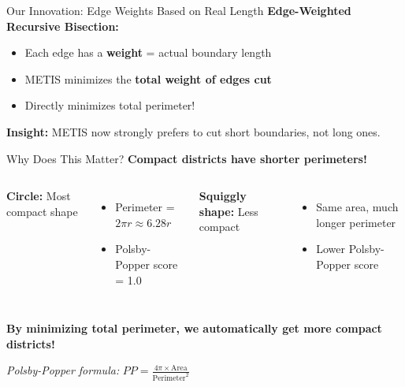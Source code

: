 \documentclass[aspectratio=169]{beamer}
\begin{document}
\begin{frame}{Our Innovation: Edge Weights Based on Real Length}
\textbf{Edge-Weighted Recursive Bisection:}
\begin{itemize}
\item Each edge has a \textbf{weight} = actual boundary length
\item METIS minimizes the \textbf{total weight of edges cut}
\item Directly minimizes total perimeter!
\end{itemize}

\vspace{1em}
\begin{center}
\end{center}

\textbf{Insight:} METIS now strongly prefers to cut short boundaries, not long ones.
\end{frame}

\begin{frame}{Why Does This Matter?}
\textbf{Compact districts have shorter perimeters!}

\vspace{1em}
\begin{columns}
\textbf{Circle:} Most compact shape
\begin{itemize}
\item Perimeter = $2\pi r \approx 6.28r$
\item Polsby-Popper score = 1.0
\end{itemize}

\textbf{Squiggly shape:} Less compact
\begin{itemize}
\item Same area, much longer perimeter
\item Lower Polsby-Popper score
\end{itemize}
\end{columns}

\vspace{1em}
\textbf{By minimizing total perimeter, we automatically get more compact districts!}

\vspace{1em}
\begin{center}
\textit{Polsby-Popper formula:} $PP = \frac{4\pi \times \text{Area}}{\text{Perimeter}^2}$
\end{center}
\end{frame}
\end{document}
